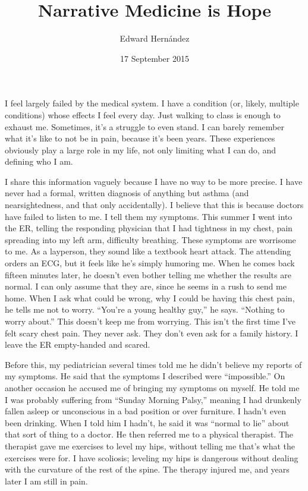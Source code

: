 \documentclass[doc,12pt]{apa6}
\begin{document}
\title{Narrative Medicine is Hope}
\author{Edward Hern\'{a}ndez}
\date{17 September 2015}
\maketitle

I feel largely failed by the medical system. I have a condition (or, likely,
multiple conditions) whose effects I feel every day. Just walking to class is
enough to exhaust me. Sometimes, it's a struggle to even stand. I can barely
remember what it's like to not be in pain, because it's been years. These
experiences obviously play a large role in my life, not only limiting what I
can do, and defining who I am.

I share this information vaguely because I have no way to be more precise. I
have never had a formal, written diagnosis of anything but asthma (and
nearsightedness, and that only accidentally). I believe that this is because
doctors have failed to listen to me. I tell them my symptoms. This summer I
went into the ER, telling the responding physician that I had tightness in my
chest, pain spreading into my left arm, difficulty breathing. These symptoms
are worrisome to me. As a layperson, they sound like a textbook heart attack.
The attending orders an ECG, but it feels like he's simply humoring me. When he
comes back fifteen minutes later, he doesn't even bother telling me whether the
results are normal. I can only assume that they are, since he seems in a rush
to send me home. When I ask what could be wrong, why I could be having this
chest pain, he tells me not to worry. ``You're a young healthy guy,'' he says.
``Nothing to worry about.'' This doesn't keep me from worrying. This isn't the
first time I've felt scary chest pain. They never ask. They don't even ask for
a family history. I leave the ER empty-handed and scared.

Before this, my pediatrician several times told me he didn't believe my reports
of my symptoms. He said that the symptoms I described were ``impossible.'' On
another occasion he accused me of bringing my symptoms on myself. He told me I
was probably suffering from ``Sunday Morning Palsy,'' meaning I had drunkenly
fallen asleep or unconscious in a bad position or over furniture. I hadn't even
been drinking. When I told him I hadn't, he said it was ``normal to lie'' about
that sort of thing to a doctor. He then referred me to a physical therapist.
The therapist gave me exercises to level my hips, without telling me that's
what the exercises were for. I have scoliosis; leveling my hips is dangerous
without dealing with the curvature of the rest of the spine. The therapy
injured me, and years later I am still in pain.
\end{document}

